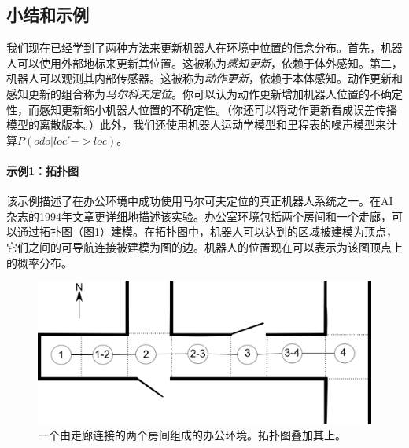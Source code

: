 \subsection{小结和示例}
我们现在已经学到了两种方法来更新机器人在环境中位置的信念分布。首先，机器人可以使用外部地标来更新其位置。这被称为\emph{感知更新}，依赖于体外感知。第二，机器人可以观测其内部传感器。这被称为\emph{动作更新}，依赖于本体感知。动作更新和感知更新的组合称为\emph{马尔科夫定位}。你可以认为动作更新增加机器人位置的不确定性，而感知更新缩小机器人位置的不确定性。（你还可以将动作更新看成误差传播模型的离散版本。）此外，我们还使用机器人运动学模型和里程表的噪声模型来计算$P(odo|loc'->loc)$。


\paragraph{示例1：拓扑图}
该示例描述了在办公环境中成功使用马尔可夫定位的真正机器人系统之一。在AI杂志的1994年文章更详细地描述该实验。办公室环境包括两个房间和一个走廊，可以通过拓扑图（图\ref{fig:dervish_example}）建模。在拓扑图中，机器人可以达到的区域被建模为顶点，它们之间的可导航连接被建模为图的边。机器人的位置现在可以表示为该图顶点上的概率分布。

\begin{figure}
	\centering
		\includegraphics[width=\textwidth]{figs/dervish_example}
	\caption{一个由走廊连接的两个房间组成的办公环境。拓扑图叠加其上。}
	\label{fig:dervish_example}
\end{figure}


